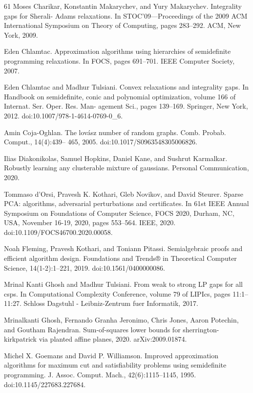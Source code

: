 \documentclass[10pt,a4paper]{article}
\theoremstyle{definition}
\begin{document}
\begin{thebibliography}{61}
Moses Charikar, Konstantin Makarychev, and Yury Makarychev. Integrality gaps for Sherali- Adams relaxations. In STOC’09—Proceedings of the 2009 ACM International Symposium on Theory of Computing, pages 283–292. ACM, New York, 2009.

Eden Chlamtac. Approximation algorithms using hierarchies of semidefinite programming relaxations. In FOCS, pages 691–701. IEEE Computer Society, 2007.

Eden Chlamtac and Madhur Tulsiani. Convex relaxations and integrality gaps. In Handbook on semidefinite, conic and polynomial optimization, volume 166 of Internat. Ser. Oper. Res. Man- agement Sci., pages 139–169. Springer, New York, 2012. doi:10.1007/978-1-4614-0769-0\_6.

Amin Coja-Oghlan. The lovász number of random graphs. Comb. Probab. Comput., 14(4):439– 465, 2005. doi:10.1017/S0963548305006826.

Ilias Diakonikolas, Samuel Hopkins, Daniel Kane, and Sushrut Karmalkar. Robustly learning any clusterable mixture of gaussians. Personal Communication, 2020.

Tommaso d’Orsi, Pravesh K. Kothari, Gleb Novikov, and David Steurer. Sparse PCA: algorithms, adversarial perturbations and certificates. In 61st IEEE Annual Symposium on Foundations of Computer Science, FOCS 2020, Durham, NC, USA, November 16-19, 2020, pages 553–564. IEEE, 2020. doi:10.1109/FOCS46700.2020.00058.

Noah Fleming, Pravesh Kothari, and Toniann Pitassi. Semialgebraic proofs and efficient algorithm design. Foundations and Trends® in Theoretical Computer Science, 14(1-2):1–221, 2019. doi:10.1561/0400000086.

Mrinal Kanti Ghosh and Madhur Tulsiani. From weak to strong LP gaps for all csps. In Computational Complexity Conference, volume 79 of LIPIcs, pages 11:1–11:27. Schloss Dagstuhl - Leibniz-Zentrum fuer Informatik, 2017.

Mrinalkanti Ghosh, Fernando Granha Jeronimo, Chris Jones, Aaron Potechin, and Goutham Rajendran. Sum-of-squares lower bounds for sherrington-kirkpatrick via planted affine planes, 2020. arXiv:2009.01874.

Michel X. Goemans and David P. Williamson. Improved approximation algorithms for maximum cut and satisfiability problems using semidefinite programming. J. Assoc. Comput. Mach., 42(6):1115–1145, 1995. doi:10.1145/227683.227684.


\end{thebibliography}
\end{document}
